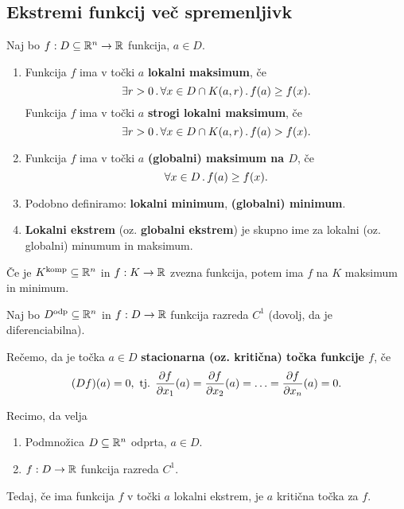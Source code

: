 \newpage
\subsection{Ekstremi funkcij več spremenljivk}
\begin{definicija}
    Naj bo $f: D \subseteq \mathbb{R}^n \to \mathbb{R}$ funkcija, $a \in D$.
    \begin{enumerate}
        \item Funkcija $f$ ima v točki $a$ \textbf{lokalni maksimum}, če 
        $$\exists r>0 \,.\, \forall x \in D \cap K(a,r) \,.\, f(a) \geq f(x).$$ 
        Funkcija $f$ ima v točki $a$ \textbf{strogi lokalni maksimum}, če
        $$\exists r>0 \,.\, \forall x \in D \cap K(a,r) \,.\, f(a) > f(x).$$ 
        \item Funkcija $f$ ima v točki $a$ \textbf{(globalni) maksimum na $D$}, če 
        $$\forall x \in D \,.\, f(a) \geq f(x).$$
        \item Podobno definiramo: \textbf{lokalni minimum}, \textbf{(globalni) minimum}.
        \item \textbf{Lokalni ekstrem} (oz. \textbf{globalni ekstrem}) je skupno ime za lokalni (oz. globalni) minumum in maksimum.
    \end{enumerate}
\end{definicija}

\begin{opomba}
    Če je $K^\text{komp} \subseteq \mathbb{R}^n$ in $f: K \to \mathbb{R}$ zvezna funkcija, potem ima $f$ na $K$ maksimum in minimum.
\end{opomba}

\begin{definicija}
    Naj bo $D^\text{odp} \subseteq \mathbb{R}^n$ in $f: D \to \mathbb{R}$ funkcija razreda $C^1$ (dovolj, da je diferenciabilna). 
    
    Rečemo, da je točka $a \in D$ \textbf{stacionarna (oz. kritična) točka  funkcije $f$}, če $$(Df)(a) = 0, \text{ tj. } \frac{\partial f}{\partial x_1}(a) = \frac{\partial f}{\partial x_2}(a) = \ldots = \frac{\partial f}{\partial x_n}(a) = 0.$$
\end{definicija}

\begin{trditev}
    Recimo, da velja
    \begin{enumerate}
        \item Podmnožica $D \subseteq \mathbb{R}^n$ odprta, $a \in D$.
        \item $f: D \to \mathbb{R}$ funkcija razreda $C^1$.
    \end{enumerate}
    Tedaj, če ima funkcija $f$ v točki $a$ lokalni ekstrem, je $a$ kritična točka za $f$.
\end{trditev}

